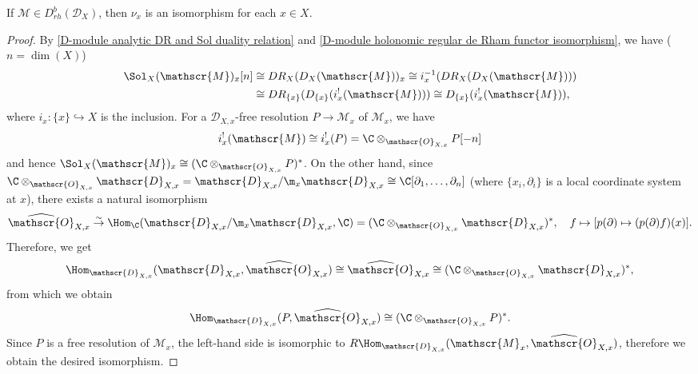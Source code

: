\begin{proposition}\label{D-module holonomic regular formal solution isomorphism}
If $\mathscr{M}\in D^b_{rh}(\mathscr{D}_X)$, then $\nu_x$ is an isomorphism for each $x\in X$.
\end{proposition}
\begin{proof}
By \cref{D-module analytic DR and Sol duality relation} and \cref{D-module holonomic regular de Rham functor isomorphism}, we have ($n=\dim(X)$)
\begin{align*}
\Sol_X(\mathscr{M})_x[n]&\cong DR_X(D_X(\mathscr{M}))_x\cong i_x^{-1}(DR_X(D_X(\mathscr{M})))\\
&\cong DR_{\{x\}}(D_{\{x\}}(i_x^!(\mathscr{M})))\cong D_{\{x\}}(i_x^!(\mathscr{M})),
\end{align*}
where $i_x:\{x\}\hookrightarrow X$ is the inclusion. For a $\mathscr{D}_{X,x}$-free resolution $P\to\mathscr{M}_x$ of $\mathscr{M}_x$, we have
\[i_x^!(\mathscr{M})\cong i_x^!(P)=\C\otimes_{\mathscr{O}_{X,x}}P[-n]\]
and hence $\Sol_X(\mathscr{M})_x\cong(\C\otimes_{\mathscr{O}_{X,x}}P)^*$. On the other hand, since $\C\otimes_{\mathscr{O}_{X,x}}\mathscr{D}_{X,x}=\mathscr{D}_{X,x}/\m_x\mathscr{D}_{X,x}\cong\C[\partial_1,\dots,\partial_n]$ (where $\{x_i,\partial_i\}$ is a local coordinate system at $x$), there exists a natural isomorphism
\begin{align*}
\widehat{\mathscr{O}}_{X,x}\stackrel{\sim}{\to}\Hom_{\C}(\mathscr{D}_{X,x}/\m_x\mathscr{D}_{X,x},\C)=(\C\otimes_{\mathscr{O}_{X,x}}\mathscr{D}_{X,x})^*,\quad f\mapsto[p(\partial)\mapsto (p(\partial)f)(x)].
\end{align*}
Therefore, we get
\begin{align*}
\Hom_{\mathscr{D}_{X,x}}(\mathscr{D}_{X,x},\widehat{\mathscr{O}}_{X,x})\cong\widehat{\mathscr{O}}_{X,x}\cong (\C\otimes_{\mathscr{O}_{X,x}}\mathscr{D}_{X,x})^*,
\end{align*}
from which we obtain
\[\Hom_{\mathscr{D}_{X,x}}(P,\widehat{\mathscr{O}}_{X,x})\cong(\C\otimes_{\mathscr{O}_{X,x}}P)^*.\]
Since $P$ is a free resolution of $\mathscr{M}_x$, the left-hand side is isomorphic to $R\Hom_{\mathscr{D}_{X,x}}(\mathscr{M}_x,\widehat{\mathscr{O}}_{X,x})$, therefore we obtain the desired isomorphism.
\end{proof}